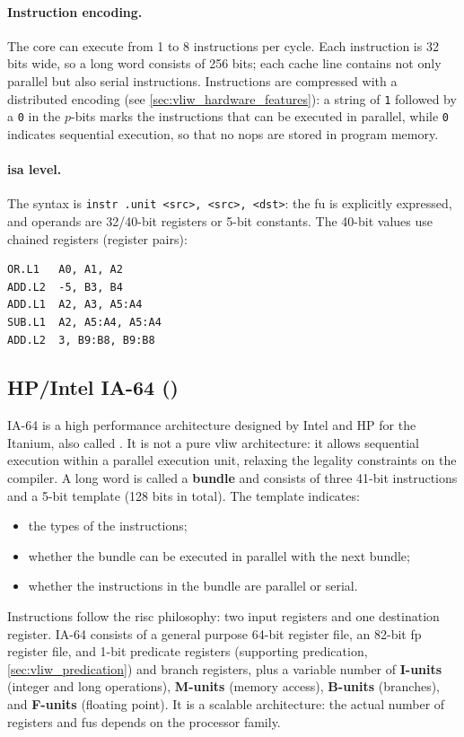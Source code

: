 \paragraph{Instruction encoding.} The core can execute from 1 to 8 instructions per cycle. Each instruction is 32 bits wide, so a long word consists of 256 bits; each cache line contains not only parallel but also serial instructions. Instructions are compressed with a distributed encoding (see \cref{sec:vliw_hardware_features}): a string of \texttt{1} followed by a \texttt{0} in the $p$-bits marks the instructions that can be executed in parallel, while \texttt{0} indicates sequential execution, so that no \glspl{nop} are stored in program memory.

\paragraph{\gls{isa} level.} The syntax is \texttt{instr .unit <src>, <src>, <dst>}: the \gls{fu} is explicitly expressed, and operands are 32/40-bit registers or 5-bit constants. The 40-bit values use chained registers (register pairs):

\begin{lstlisting}[language={}, caption={TI C6xxx instruction examples}]
OR.L1   A0, A1, A2
ADD.L2  -5, B3, B4
ADD.L1  A2, A3, A5:A4
SUB.L1  A2, A5:A4, A5:A4
ADD.L2  3, B9:B8, B9:B8
\end{lstlisting}

\subsection{HP/Intel IA-64 ()}

IA-64 is a high performance architecture designed by Intel and HP for the Itanium, also called . It is not a pure \gls{vliw} architecture: it allows sequential execution within a parallel execution unit, relaxing the legality constraints on the compiler. A long word is called a \textbf{bundle} and consists of three 41-bit instructions and a 5-bit template (128 bits in total). The template indicates:
\begin{itemize}
    \item the types of the instructions;
    \item whether the bundle can be executed in parallel with the next bundle;
    \item whether the instructions in the bundle are parallel or serial.
\end{itemize}
Instructions follow the \gls{risc} philosophy: two input registers and one destination register. IA-64 consists of a general purpose 64-bit register file, an 82-bit \gls{fp} register file, and 1-bit predicate registers (supporting predication, \cref{sec:vliw_predication}) and branch registers, plus a variable number of \textbf{I-units} (integer and long operations), \textbf{M-units} (memory access), \textbf{B-units} (branches), and \textbf{F-units} (floating point). It is a scalable architecture: the actual number of registers and \glspl{fu} depends on the processor family.

